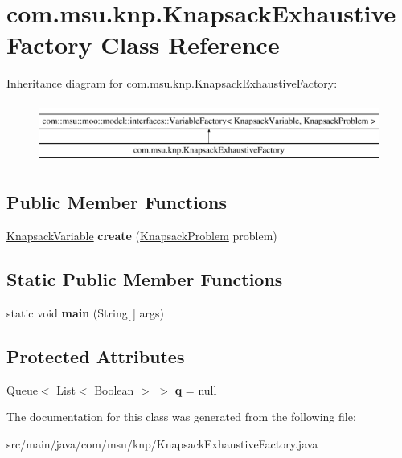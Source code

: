 \hypertarget{classcom_1_1msu_1_1knp_1_1KnapsackExhaustiveFactory}{\section{com.\-msu.\-knp.\-Knapsack\-Exhaustive\-Factory Class Reference}
\label{classcom_1_1msu_1_1knp_1_1KnapsackExhaustiveFactory}
}
Inheritance diagram for com.\-msu.\-knp.\-Knapsack\-Exhaustive\-Factory\-:\begin{figure}[H]
\begin{center}
\leavevmode
\includegraphics[height=2.000000cm]{classcom_1_1msu_1_1knp_1_1KnapsackExhaustiveFactory}
\end{center}
\end{figure}
\subsection*{Public Member Functions}
\begin{DoxyCompactItemize}
\item 
\hypertarget{classcom_1_1msu_1_1knp_1_1KnapsackExhaustiveFactory_a5e204da3a25b44b428abb0fb592ebffe}{\hyperlink{classcom_1_1msu_1_1knp_1_1KnapsackVariable}{Knapsack\-Variable} {\bfseries create} (\hyperlink{classcom_1_1msu_1_1knp_1_1KnapsackProblem}{Knapsack\-Problem} problem)}\label{classcom_1_1msu_1_1knp_1_1KnapsackExhaustiveFactory_a5e204da3a25b44b428abb0fb592ebffe}

\end{DoxyCompactItemize}
\subsection*{Static Public Member Functions}
\begin{DoxyCompactItemize}
\item 
\hypertarget{classcom_1_1msu_1_1knp_1_1KnapsackExhaustiveFactory_acdbd5e5253450a5717d38d957d079d38}{static void {\bfseries main} (String\mbox{[}$\,$\mbox{]} args)}\label{classcom_1_1msu_1_1knp_1_1KnapsackExhaustiveFactory_acdbd5e5253450a5717d38d957d079d38}

\end{DoxyCompactItemize}
\subsection*{Protected Attributes}
\begin{DoxyCompactItemize}
\item 
\hypertarget{classcom_1_1msu_1_1knp_1_1KnapsackExhaustiveFactory_afb5a77a29446181ea76319057f403d0c}{Queue$<$ List$<$ Boolean $>$ $>$ {\bfseries q} = null}\label{classcom_1_1msu_1_1knp_1_1KnapsackExhaustiveFactory_afb5a77a29446181ea76319057f403d0c}

\end{DoxyCompactItemize}


The documentation for this class was generated from the following file\-:\begin{DoxyCompactItemize}
\item 
src/main/java/com/msu/knp/Knapsack\-Exhaustive\-Factory.\-java\end{DoxyCompactItemize}
